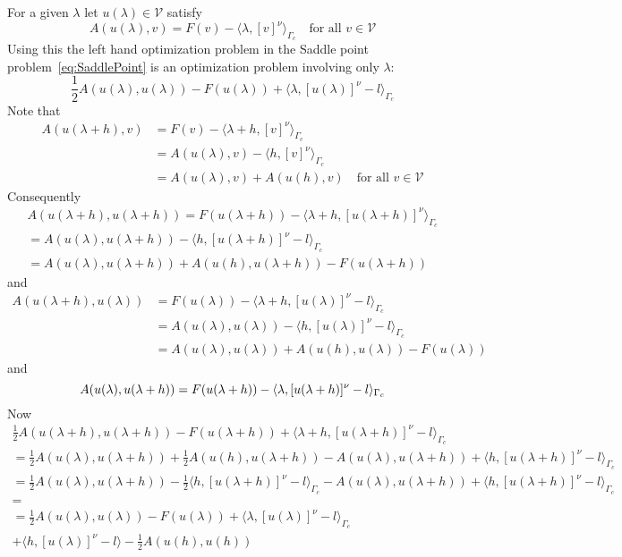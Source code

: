 \documentclass[12pt,a4paper]{article}
\numberwithin{equation}{section}
\numberwithin{table}{section}
\numberwithin{figure}{section}
\newcommand{\half}{\ensuremath{\frac{1}{2}}}
\newcommand{\V}{\ensuremath{\mathcal{V}}}
\providecommand{\dualp}[2]{\langle #1, #2 \rangle}
\newcommand{\ulambda}{\ensuremath{u(\lambda)}}
\newcommand{\ulambdah}{\ensuremath{u(\lambda+h)}}
\newcommand{\ulh}{\ensuremath{u(h)}}
\newcommand{\qforall}{\quad\text{for all }}
\begin{document}
For a given $\lambda$ let $\ulambda\in \V$ satisfy
\begin{equation}
  A(\ulambda, v) = F(v) - \dualp{\lambda}{[v]^\nu}_{\Gamma_c}
  \qforall v\in \V
\end{equation}
Using this the left hand optimization problem in the Saddle point
problem~\ref{eq:SaddlePoint} is an optimization problem involving only $\lambda$:
\begin{equation}
\half A(\ulambda,\ulambda) - F(\ulambda) + \dualp{\lambda}{[\ulambda]^\nu - l}_{\Gamma_c}  
\end{equation}
Note that
\begin{align}
  A(\ulambdah, v) &= F(v) - \dualp{\lambda+h}{[v]^\nu}_{\Gamma_c} \\
  &= A(\ulambda, v) - \dualp{h}{[v]^\nu}_{\Gamma_c} \\
  &= A(\ulambda, v) + A(\ulh,v)
  \qforall v\in \V
\end{align}
Consequently
\begin{multline}
  A(\ulambdah, \ulambdah) = F(\ulambdah) - \dualp{\lambda+h}{[\ulambdah]^\nu}_{\Gamma_c} \\
  = A(\ulambda, \ulambdah) - \dualp{h}{[\ulambdah]^\nu - l}_{\Gamma_c} \\
  = A(\ulambda, \ulambdah) + A(\ulh,\ulambdah) - F(\ulambdah)
\end{multline}
and
\begin{align}
  A(\ulambdah, \ulambda) &= F(\ulambda) - \dualp{\lambda+h}{[\ulambda]^\nu - l}_{\Gamma_c} \\
  &= A(\ulambda, \ulambda) - \dualp{h}{[\ulambda]^\nu - l}_{\Gamma_c} \\
  &= A(\ulambda, \ulambda) + A(\ulh,\ulambda) - F(\ulambda)
\end{align}
and
\begin{equation}
  A(\ulambda, \ulambdah) = F(\ulambdah) - \dualp{\lambda}{[\ulambdah]^\nu - l}_{\Gamma_c} \\
\end{equation}
Now
\begin{multline*}
  \half A(\ulambdah,\ulambdah) - F(\ulambdah) + \dualp{\lambda+h}{[\ulambdah]^\nu -
    l}_{\Gamma_c}  \\
  = \half A(\ulambda,\ulambdah) + \half A(\ulh, \ulambdah) - A(\ulambda, \ulambdah)
  + \dualp{h}{[\ulambdah]^\nu-l}_{\Gamma_c}  \\
  = \half A(\ulambda, \ulambdah) - \half\dualp{h}{[\ulambdah]^\nu - l}_{\Gamma_c}
  -  A(\ulambda, \ulambdah) + \dualp{h}{[\ulambdah]^\nu -
    l}_{\Gamma_c}  \\
  = \\
  =   \half A(\ulambda,\ulambda) - F(\ulambda) + \dualp{\lambda}{[\ulambda]^\nu -
    l}_{\Gamma_c} \\ + \dualp{h}{[\ulambda]^\nu-l} -\half A(\ulh,\ulh) \\
\end{multline*}
\end{document}
